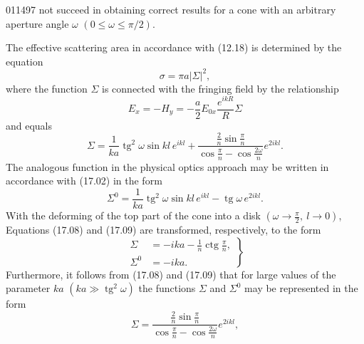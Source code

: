 \begin{scanpage}{0114}{97}
not succeed in obtaining correct results for a cone with an arbitrary aperture angle $\omega$ $(0\leq\omega\leq\pi/2)$.

The effective scattering area in accordance with (12.18) is determined by the equation
\[\sigma=\pi a|\Sigma|^2,\tag{17.06}\]
where the function $\Sigma$ is connected with the fringing field by the relationship
\[E_x=-H_y=-\frac a2E_{0x}\frac{e^{ikR}}R\Sigma\tag{17.07}\]
and equals
\[\Sigma=\frac1{ka}\operatorname{tg}^2\omega\sin kl\,e^{ikl}+\frac{\frac2n\sin\frac\pi n}{\cos\frac\pi n-\cos\frac{2\omega}n}e^{2ikl}.\tag{17.08}\]
The analogous function in the physical optics approach may be written in accordance with (17.02) in the form
\[\Sigma^0=\frac1{ka}\operatorname{tg}^2\omega\sin kl\,e^{ikl}-\operatorname{tg}\omega\,e^{2ikl}.\tag{17.09}\]
With the deforming of the top part of the cone into a disk $(\omega\to\frac\pi2,\ l\to0)$, Equations (17.08) and (17.09) are transformed, respectively, to the form
\[\left.\begin{aligned}\Sigma&=-ika-\frac1n\operatorname{ctg}\frac\pi n,\\\Sigma^0&=-ika.\end{aligned}\right\}\tag{17.10}\]
Furthermore, it follows from (17.08) and (17.09) that for large values of the parameter $ka$ $(ka\gg\operatorname{tg}^2\omega)$ the functions $\Sigma$ and $\Sigma^0$ may be represented in the form
\[\Sigma=\frac{\frac2n\sin\frac\pi n}{\cos\frac\pi n-\cos\frac{2\omega}n}e^{2ikl},\tag{17.11}\]
\end{scanpage}
